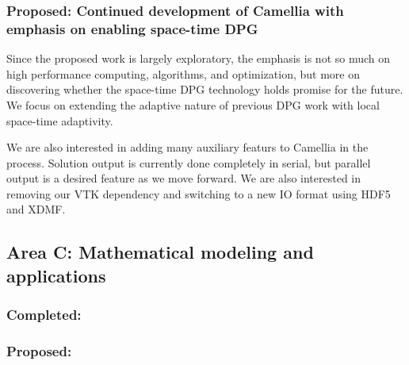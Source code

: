 \documentclass[12pt]{report}
\begin{document}
 \subsubsection*{Proposed: Continued development of Camellia with emphasis on enabling space-time DPG}
Since the proposed work is largely exploratory, the emphasis is not so much on high performance computing, algorithms, and optimization, but more on discovering whether the space-time DPG technology holds promise for the future. We focus on extending the adaptive nature of previous DPG work with local space-time adaptivity.

We are also interested in adding many auxiliary featurs to Camellia in the process. Solution output is currently done completely in serial, but parallel output is a desired feature as we move forward. We are also interested in removing our VTK dependency and switching to a new IO format using HDF5 and XDMF.

\subsection{Area C: Mathematical modeling and applications}
\subsubsection*{Completed:}
\subsubsection*{Proposed:}



\end{document}
